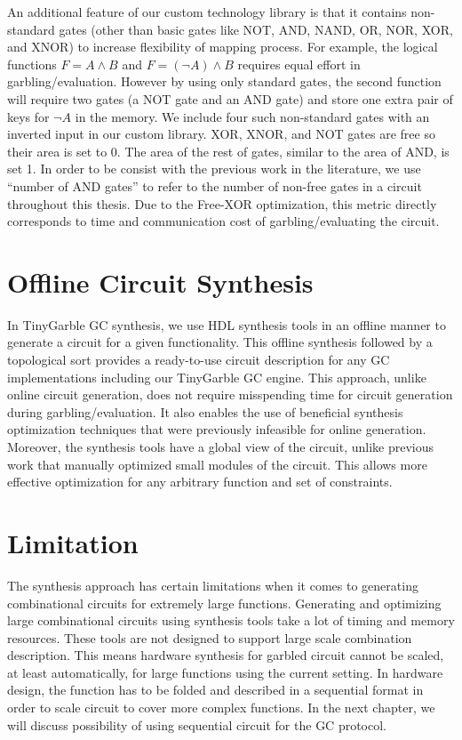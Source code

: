 An additional feature of our custom technology library is that it contains non-standard gates (other than basic gates like NOT, AND, NAND, OR, NOR, XOR, and XNOR) to increase flexibility of mapping process.
For example, the logical functions $F = A\wedge B$ and $F = (\neg A)\wedge B$ requires equal effort in garbling/evaluation.
However by using only standard gates, the second function will require two gates (a NOT gate and an AND gate) and store one extra pair of keys for $\neg A$ in the memory.
We include four such non-standard gates with an inverted input in our custom library.
XOR, XNOR, and NOT gates are free so their area is set to 0.
The area of the rest of gates, similar to the area of AND, is set 1.
In order to be consist with the previous work in the literature, we use ``number of AND gates'' to refer to the number of non-free gates in a circuit throughout this thesis.
Due to the Free-XOR optimization, this metric directly corresponds to time and communication cost of garbling/evaluating the circuit.

\section{Offline Circuit Synthesis}
In TinyGarble GC synthesis, we use HDL synthesis tools in an offline manner to generate a circuit for a given functionality.
This offline synthesis followed by a topological sort provides a ready-to-use circuit description for any GC implementations including our TinyGarble GC engine.
This approach, unlike online circuit generation, does not require misspending time for circuit generation during garbling/evaluation.
It also enables the use of beneficial synthesis optimization techniques that were previously infeasible for online generation.
Moreover, the synthesis tools have a global view of the circuit, unlike previous work that manually optimized small modules of the circuit.
This allows more effective optimization for any arbitrary function and set of constraints.

\section{Limitation}\label{sect:syn-limit}
The synthesis approach has certain limitations when it comes to generating combinational circuits for extremely large functions.
Generating and optimizing large combinational circuits using synthesis tools take a lot of timing and memory resources.
These tools are not designed to support large scale combination description.
This means hardware synthesis for garbled circuit cannot be scaled, at least automatically, for large functions using the current setting.
In hardware design, the function has to be folded and described in a sequential format in order to scale circuit to cover more complex functions.
In the next chapter, we will discuss possibility of using sequential circuit for the GC protocol.
